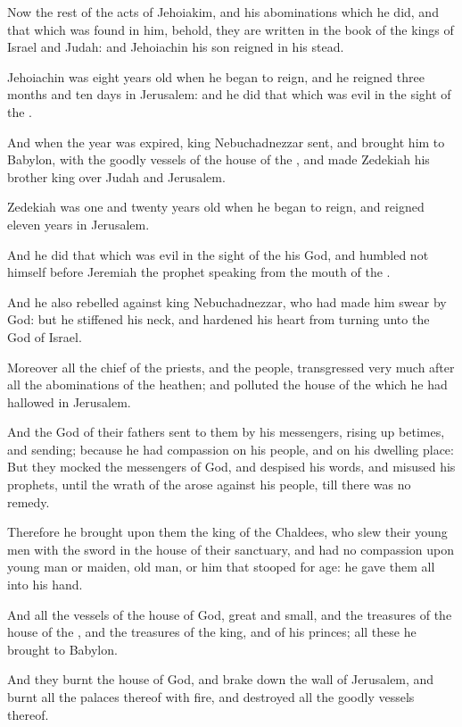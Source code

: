 \verse Now the rest of the acts of Jehoiakim, and his abominations which he did, and that which was found in him, behold, they are written in the book of the kings of Israel and Judah: and Jehoiachin his son reigned in his stead.

\verse Jehoiachin was eight years old when he began to reign, and he reigned three months and ten days in Jerusalem: and he did that which was evil in the sight of the \LORD.

\verse And when the year was expired, king Nebuchadnezzar sent, and brought him to Babylon, with the goodly vessels of the house of the \LORD, and made Zedekiah his brother king over Judah and Jerusalem.

\verse Zedekiah was one and twenty years old when he began to reign, and reigned eleven years in Jerusalem.

\verse And he did that which was evil in the sight of the \LORD his God, and humbled not himself before Jeremiah the prophet speaking from the mouth of the \LORD.

\verse And he also rebelled against king Nebuchadnezzar, who had made him swear by God: but he stiffened his neck, and hardened his heart from turning unto the \LORD God of Israel.

\verse Moreover all the chief of the priests, and the people, transgressed very much after all the abominations of the heathen; and polluted the house of the \LORD which he had hallowed in Jerusalem.

\verse And the \LORD God of their fathers sent to them by his messengers, rising up betimes, and sending; because he had compassion on his people, and on his dwelling place: \verse But they mocked the messengers of God, and despised his words, and misused his prophets, until the wrath of the \LORD arose against his people, till there was no remedy.

\verse Therefore he brought upon them the king of the Chaldees, who slew their young men with the sword in the house of their sanctuary, and had no compassion upon young man or maiden, old man, or him that stooped for age: he gave them all into his hand.

\verse And all the vessels of the house of God, great and small, and the treasures of the house of the \LORD, and the treasures of the king, and of his princes; all these he brought to Babylon.

\verse And they burnt the house of God, and brake down the wall of Jerusalem, and burnt all the palaces thereof with fire, and destroyed all the goodly vessels thereof.

